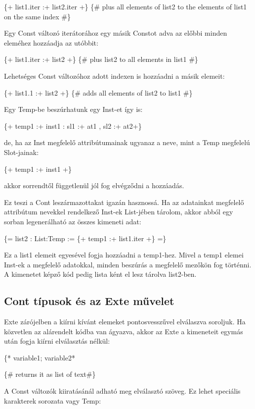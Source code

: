 {\{+ list1.iter :+ list2.iter +\} \{\# plus all elements of list2 to the elements of list1 on the same index \#\}

Egy Const változó iterátorához egy másik Constot adva az előbbi minden eleméhez hozzáadja az utóbbit:

\{+ list1.iter :+ list2 +\} \{\# plus list2 to all elements in list1 \#\}

Lehetséges Const változóhoz adott indexen is hozzáadni a másik elemeit:

\{+ list1.1 :+ list2 +\} \{\# adds all elements of list2 to list1 \#\}

Egy Temp-be beszúrhatunk egy Inst-et így is:

\{+ temp1 :+ inst1 : sl1 :+ at1 , sl2 :+ at2+\}

de, ha az Inst megfelelő attribútumainak ugyanaz a neve, mint a Temp megfelelú Slot-jainak:

\{+ temp1 :+ inst1 +\}

akkor sorrendtől függetlenül jól fog elvégződni a hozzáadás.

Ez teszi a Cont leszármazottakat igazán hasznossá.
Ha az adatainkat megfelelő attribútum nevekkel rendelkező Inst-ek List-jében tárolom,
akkor abból egy sorban legenerálható az összes kimeneti adat:

\{= list2 : List:Temp := \{+ temp1 :+ list1.iter +\} =\}

Ez a list1 elemeit egyesével fogja hozzáadni a temp1-hez.
Mivel a temp1 elemei Inst-ek a megfelelő adatokkal, minden beszúrás a megfelelő mezőkön fog történni.
A kimenetet képző kód pedig lista ként el lesz tárolva list2-ben.



\subsection{Cont típusok és az Exte művelet}
Exte zárójelben a kiírni kívánt elemeket pontosvesszűvel elválaszva soroljuk.
Ha közvetlen az alárendelt kódba van ágyazva, akkor az Exte a kimeneteit egymás után fogja kiírni elválasztás nélkül:

\{* variable1; variable2*} \{\# returns it as list of text\#\}

A Const változók kiiratásánál adható meg elválasztó szöveg.
Ez lehet speciális karakterek sorozata vagy Temp:

